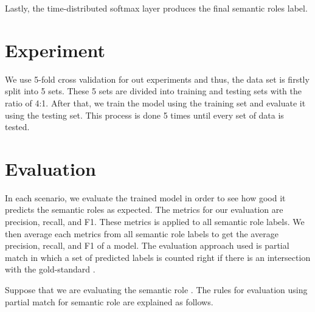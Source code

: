 Lastly, the time-distributed softmax layer produces the final semantic roles label.

\section{Experiment}
We use 5-fold cross validation for out experiments and thus, the data set is firstly split into 5 sets. These 5 sets are divided into training and testing sets with the ratio of 4:1. After that, we train the model using the training set and evaluate it using the testing set. This process is done 5 times until every set of data is tested.

\section{Evaluation}
In each scenario, we evaluate the trained model in order to see how good it predicts the semantic roles as expected. The metrics for our evaluation are precision, recall, and F1. These metrics is applied to all semantic role labels. We then average each metrics from all semantic role labels to get the average precision, recall, and F1 of a model. The evaluation approach used is partial match in which a set of predicted labels is counted right if there is an intersection with the gold-standard \citep{seki2003probabilistic}. 

Suppose that we are evaluating the semantic role \patient. The rules for evaluation using partial match for semantic role \patient are explained as follows.

